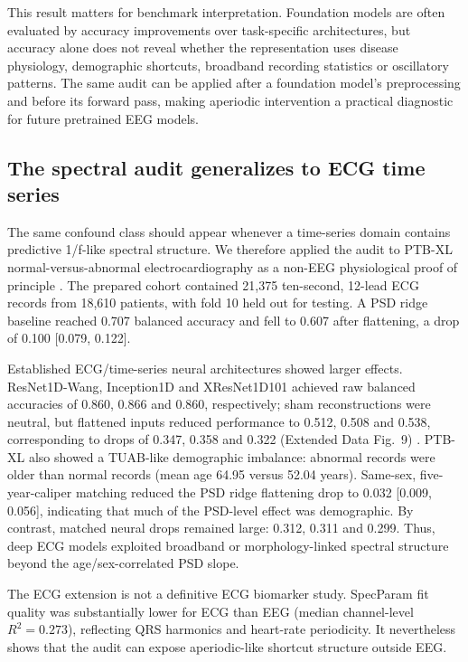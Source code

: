 \documentclass[pdflatex,sn-nature]{sn-jnl}
\begin{document}
This result matters for benchmark interpretation. Foundation models are often evaluated by accuracy improvements over task-specific architectures, but accuracy alone does not reveal whether the representation uses disease physiology, demographic shortcuts, broadband recording statistics or oscillatory patterns. The same audit can be applied after a foundation model's preprocessing and before its forward pass, making aperiodic intervention a practical diagnostic for future pretrained EEG models.

\subsection{The spectral audit generalizes to ECG time series}

The same confound class should appear whenever a time-series domain contains predictive 1/f-like spectral structure. We therefore applied the audit to PTB-XL normal-versus-abnormal electrocardiography as a non-EEG physiological proof of principle \cite{wagner2020ptbxl,goldberger2000physionet}. The prepared cohort contained 21,375 ten-second, 12-lead ECG records from 18,610 patients, with fold 10 held out for testing. A PSD ridge baseline reached 0.707 balanced accuracy and fell to 0.607 after flattening, a drop of 0.100 [0.079, 0.122].

Established ECG/time-series neural architectures showed larger effects. ResNet1D-Wang, Inception1D and XResNet1D101 achieved raw balanced accuracies of 0.860, 0.866 and 0.860, respectively; sham reconstructions were neutral, but flattened inputs reduced performance to 0.512, 0.508 and 0.538, corresponding to drops of 0.347, 0.358 and 0.322 (Extended Data Fig.~9) \cite{wang2017timeseries,fawaz2020inceptiontime}. PTB-XL also showed a TUAB-like demographic imbalance: abnormal records were older than normal records (mean age 64.95 versus 52.04 years). Same-sex, five-year-caliper matching reduced the PSD ridge flattening drop to 0.032 [0.009, 0.056], indicating that much of the PSD-level effect was demographic. By contrast, matched neural drops remained large: 0.312, 0.311 and 0.299. Thus, deep ECG models exploited broadband or morphology-linked spectral structure beyond the age/sex-correlated PSD slope.

The ECG extension is not a definitive ECG biomarker study. SpecParam fit quality was substantially lower for ECG than EEG (median channel-level $R^2=0.273$), reflecting QRS harmonics and heart-rate periodicity. It nevertheless shows that the audit can expose aperiodic-like shortcut structure outside EEG.
\end{document}
